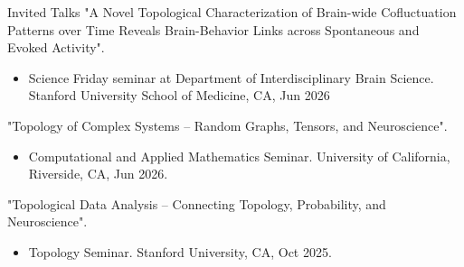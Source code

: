 \documentclass{resume} %
\begin{document}
\begin{rSection}{Invited Talks}
"A Novel Topological Characterization of Brain-wide Cofluctuation Patterns over Time Reveals Brain-Behavior Links across Spontaneous and Evoked Activity".
\begin{itemize}[noitemsep]
    \item Science Friday seminar at Department of Interdisciplinary Brain Science. Stanford University School of Medicine, CA, Jun 2026
\end{itemize}

"Topology of Complex Systems -- Random Graphs, Tensors, and Neuroscience".
\begin{itemize}[noitemsep]
	\item Computational and Applied Mathematics Seminar. University of California, Riverside, CA, Jun 2026.
\end{itemize}

"Topological Data Analysis -- Connecting Topology, Probability, and Neuroscience".
\begin{itemize}[noitemsep]
	\item Topology Seminar. Stanford University, CA, Oct 2025.
\end{itemize}


\end{rSection}
\end{document}
